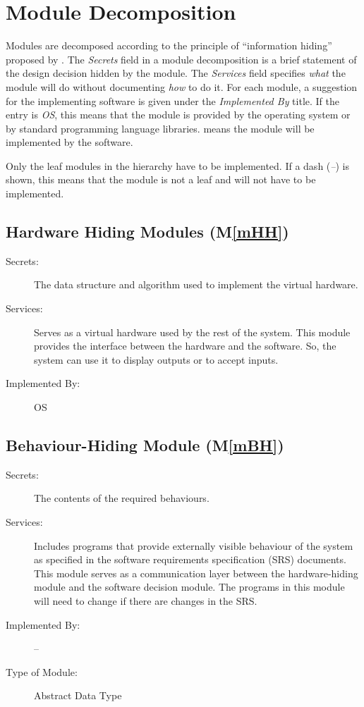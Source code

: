 \documentclass[12pt, titlepage]{article}
\newcommand{\mref}[1]{M\ref{#1}}
\begin{document}
\section{Module Decomposition} \label{SecMD}

Modules are decomposed according to the principle of ``information hiding''
proposed by \citet{ParnasEtAl1984}. The \emph{Secrets} field in a module
decomposition is a brief statement of the design decision hidden by the
module. The \emph{Services} field specifies \emph{what} the module will do
without documenting \emph{how} to do it. For each module, a suggestion for the
implementing software is given under the \emph{Implemented By} title. If the
entry is \emph{OS}, this means that the module is provided by the operating
system or by standard programming language libraries.  \emph{\progname{}} means the
module will be implemented by the \progname{} software.

Only the leaf modules in the hierarchy have to be implemented. If a dash
(\emph{--}) is shown, this means that the module is not a leaf and will not have
to be implemented.

\subsection{Hardware Hiding Modules (\mref{mHH})}

\begin{description}
\item[Secrets:]The data structure and algorithm used to implement the virtual
  hardware.
\item[Services:]Serves as a virtual hardware used by the rest of the
  system. This module provides the interface between the hardware and the
  software. So, the system can use it to display outputs or to accept inputs.
\item[Implemented By:] OS
\end{description}

\subsection{Behaviour-Hiding Module (\mref{mBH})}

\begin{description}
\item[Secrets:]The contents of the required behaviours.
\item[Services:]Includes programs that provide externally visible behaviour of
  the system as specified in the software requirements specification (SRS)
  documents. This module serves as a communication layer between the
  hardware-hiding module and the software decision module. The programs in this
  module will need to change if there are changes in the SRS.
\item[Implemented By:] --
\item[Type of Module:] Abstract Data Type
\end{description}
\end{document}
